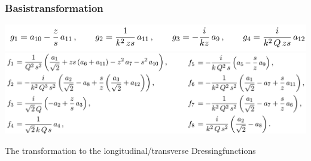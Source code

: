 \begin{frame}\frametitle{Basistransformation}
\begin{minipage}[r]{1.\textwidth}
	\hspace{2mm}
	\includegraphics[scale=0.8]{gs.pdf}
	\vspace{4mm}
	\includegraphics[scale=0.7]{fs.png}
\end{minipage}

\small The transformation to the longitudinal/transverse Dressingfunctions

\vspace{3mm}
%



\end{frame}


\endinput
